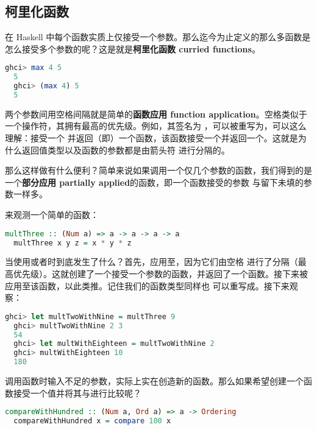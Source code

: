 \documentclass[./main.tex]{subfiles}
\begin{document}
\subsection*{柯里化函数}

在 Haskell 中每个函数实质上仅接受一个参数。那么迄今为止定义的那么多函数是怎么接受多个参数的呢？这是就是\textbf{柯里化函数 curried functions}。

\begin{lstlisting}[language=Haskell]
  ghci> max 4 5
  5
  ghci> (max 4) 5
  5
\end{lstlisting}

两个参数间用空格间隔就是简单的\textbf{函数应用 function application}。空格类似于一个操作符，其拥有最高的优先级。例如，其签名为
，可以被重写为，可以这么理解：接受一个
并返回（即\acode{->}）一个函数，该函数接受一个并返回一个。这就是为什么返回值类型以及函数的参数都是由箭头符
进行分隔的。

那么这样做有什么便利？简单来说如果调用一个仅几个参数的函数，我们得到的是一个\textbf{部分应用 partially applied}的函数，即一个函数接受的参数
与留下未填的参数一样多。

来观测一个简单的函数：

\begin{lstlisting}[language=Haskell]
  multThree :: (Num a) => a -> a -> a -> a
  multThree x y z = x * y * z
\end{lstlisting}

当使用或者时到底发生了什么？首先，应用至，因为它们由空格
进行了分隔（最高优先级）。这就创建了一个接受一个参数的函数，并返回了一个函数。接下来被应用至该函数，以此类推。记住我们的函数类型同样也
可以重写成。接下来观察：

\begin{lstlisting}[language=Haskell]
  ghci> let multTwoWithNine = multThree 9
  ghci> multTwoWithNine 2 3
  54
  ghci> let multWithEighteen = multTwoWithNine 2
  ghci> multWithEighteen 10
  180
\end{lstlisting}

调用函数时输入不足的参数，实际上实在创造新的函数。那么如果希望创建一个函数接受一个值并将其与进行比较呢？

\begin{lstlisting}[language=Haskell]
  compareWithHundred :: (Num a, Ord a) => a -> Ordering
  compareWithHundred x = compare 100 x
\end{lstlisting}
\end{document}
